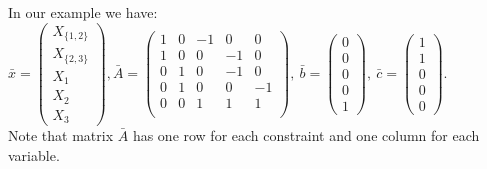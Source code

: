 \begin{ex}
    In our example we have: $\bar{x} =
    \begin{pmatrix}
        X_{\{1,2\}} \\ X_{\{2,3\}} \\ X_1 \\ X_2 \\ X_3
    \end{pmatrix}, \bar{A} =
    \begin{pmatrix}
    1 & 0 & -1 & 0 & 0 \\
    1 & 0 & 0 & -1 & 0 \\
    0 & 1 & 0 & -1 & 0 \\
    0 & 1 & 0 & 0 & -1 \\
    0 & 0 & 1 & 1 & 1 \\
    \end{pmatrix},\ \bar{b} =
    \begin{pmatrix}
        0 \\ 0 \\ 0 \\ 0 \\ 1
    \end{pmatrix},\ \bar{c} =
    \begin{pmatrix}
        1 \\ 1 \\ 0 \\ 0 \\ 0
    \end{pmatrix}$.\\
    Note that matrix $\bar{A}$ has one row for each constraint and one column for each variable.
    

\end{ex}
